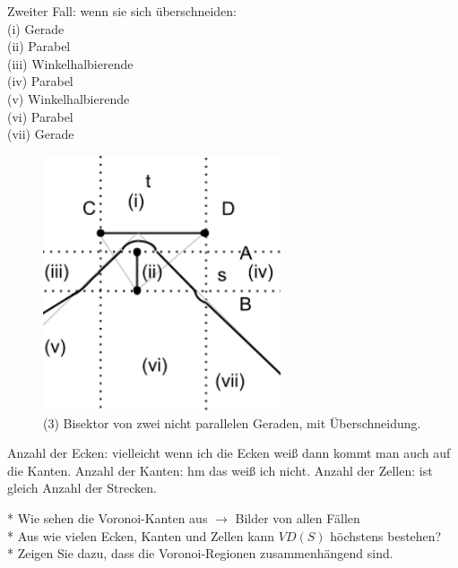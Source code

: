 Zweiter Fall: wenn sie sich überschneiden:\\
(i) Gerade\\
(ii) Parabel\\
(iii) Winkelhalbierende\\
(iv) Parabel\\
(v) Winkelhalbierende\\
(vi) Parabel\\
(vii) Gerade\\

\begin{figure}[h]
\begin{center}
\includegraphics[width=7cm]{img/ssnpin.png}
\end{center}
\caption{(3) Bisektor von zwei nicht parallelen Geraden, mit Überschneidung.}
\label{fig:a5}
\end{figure}


Anzahl der Ecken: vielleicht wenn ich die Ecken weiß dann kommt man auch auf die Kanten.
Anzahl der Kanten: hm das weiß ich nicht.
Anzahl der Zellen: ist gleich Anzahl der Strecken.

* Wie sehen die Voronoi-Kanten aus $\rightarrow$ Bilder von allen Fällen\\
* Aus wie vielen Ecken, Kanten und Zellen kann $VD(S)$ höchstens bestehen?\\
* Zeigen Sie dazu, dass die Voronoi-Regionen zusammenhängend sind.